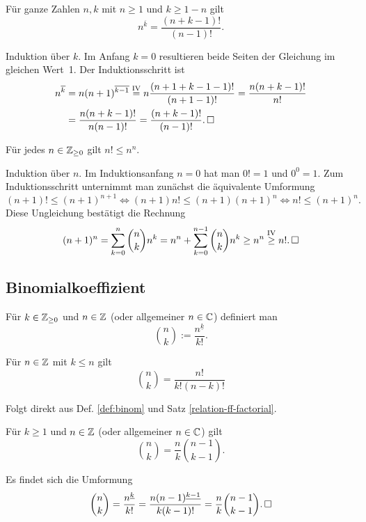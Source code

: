 \begin{Satz}
Für ganze Zahlen $n,k$ mit $n\ge 1$ und $k\ge 1-n$ gilt
\[n^{\overline k} = \frac{(n+k-1)!}{(n-1)!}.\]
\end{Satz}
\begin{Beweis}
Induktion über $k$. Im Anfang $k=0$ resultieren beide Seiten der
Gleichung im gleichen Wert~1. Der Induktionsschritt ist
\begin{align*}
n^{\overline k} &= n(n+1)^{\overline{k-1}}
\stackrel{\text{IV}}= n\frac{(n+1+k-1-1)!}{(n+1-1)!}
= \frac{n(n+k-1)!}{n!}\\
&= \frac{n(n+k-1)!}{n(n-1)!}
= \frac{(n+k-1)!}{(n-1)!}.\,\square
\end{align*}
\end{Beweis}

\begin{Satz}
Für jedes $n\in\mathbb Z_{\ge 0}$ gilt $n!\le n^n$.
\end{Satz}
\begin{Beweis}
Induktion über $n$. Im Induktionsanfang $n=0$ hat man $0! = 1$ und $0^0=1$.
Zum Induktionsschritt unternimmt man zunächst die äquivalente Umformung
\[(n+1)!\le (n+1)^{n+1} \iff (n+1)n!\le (n+1)(n+1)^n
\iff n!\le (n+1)^n.\]
Diese Ungleichung bestätigt die Rechnung
\[(n+1)^n = \sum_{k=0}^n\binom{n}{k}n^k =
n^n+\sum_{k=0}^{n-1}\binom{n}{k}n^k\ge n^n
\stackrel{\mathrm{IV}}\ge n!.\,\square\]
\end{Beweis}

\newpage
\subsection{Binomialkoeffizient}

\begin{Definition}[Binomialkoeffizient]%
\label{def:binom}\newlinefirst
Für $k\in\mathbb Z_{\ge 0}$ und $n\in\mathbb Z$ (oder allgemeiner $n\in\mathbb C$)
definiert man
\[\binom{n}{k} := \frac{n^{\underline k}}{k!}.\]
\end{Definition}

\begin{Satz}
Für $n\in\mathbb Z$ mit $k\le n$ gilt
\[\binom{n}{k} = \frac{n!}{k!(n-k)!}\]
\end{Satz}
\begin{Beweis}
Folgt direkt aus Def. \ref{def:binom} und Satz
\ref{relation-ff-factorial}.\,\qedsymbol
\end{Beweis}

\begin{Satz}
Für $k\ge 1$ und $n\in\mathbb Z$ (oder allgemeiner $n\in\mathbb C$) gilt
\[\binom{n}{k} = \frac{n}{k}\binom{n-1}{k-1}.\]
\end{Satz}
\begin{Beweis}
Es findet sich die Umformung
\[\binom{n}{k} = \frac{n^{\underline k}}{k!}
= \frac{n(n-1)^{\underline {k-1}}}{k(k-1)!}
= \frac{n}{k}\binom{n-1}{k-1}.\,\square\]
\end{Beweis}

